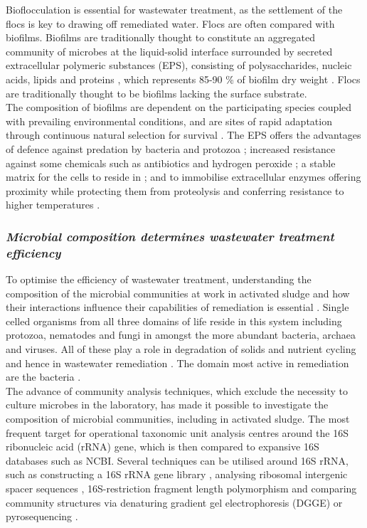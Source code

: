 \documentclass[twoside]{article}
\begin{document}
Bioflocculation is essential for wastewater treatment, as the settlement of the flocs is key to drawing off remediated water. Flocs are often compared with biofilms. Biofilms are traditionally thought to constitute an aggregated community of microbes at the liquid-solid interface surrounded by secreted extracellular polymeric substances (EPS), consisting of polysaccharides, nucleic acids, lipids and proteins \cite{wingender1999}, which represents 85-90 \% of biofilm dry weight \cite{Frolund_96}. Flocs are traditionally thought to be biofilms lacking the surface substrate.\\


The composition of biofilms are dependent on the participating species coupled with prevailing environmental conditions, and are sites of rapid adaptation through continuous natural selection for survival \cite{boles2008,matz2005,palmer2001}.  
The EPS offers the advantages of defence against predation by bacteria \cite{rao2005} and protozoa \cite{matz2005}; increased resistance against some chemicals such as antibiotics and hydrogen peroxide \cite{burmolle_06}; a stable matrix for the cells to reside in \cite{Flemming_10}; and to immobilise extracellular enzymes offering proximity while protecting them from proteolysis and conferring resistance to higher temperatures \cite{wingender2002extracellular,Flemming_10,skillman1998}.\\

\subsubsection{\emph{Microbial composition determines wastewater treatment efficiency}}
To optimise the efficiency of wastewater treatment, understanding the composition of the microbial communities at work in activated sludge and how their interactions influence their capabilities of remediation is essential \cite{daims2006}.
Single celled organisms from all three domains of life reside in this system including protozoa, nematodes and fungi in amongst the more abundant bacteria, archaea and viruses. All of these play a role in degradation of solids and nutrient cycling and hence in wastewater remediation \cite{muchie2010bioremediation}. The domain most active in remediation are the bacteria \cite{spellman2008handbook}.\\


The advance of community analysis techniques, which exclude the necessity to culture microbes in the laboratory, has made it possible to investigate the composition of microbial communities, including in activated sludge. The most frequent target for operational taxonomic unit analysis centres around the 16S ribonucleic acid (rRNA) gene, which is then compared to expansive 16S databases such as NCBI. Several techniques can be utilised around 16S rRNA, such as constructing a 16S rRNA gene library \cite{McGarvey_04}, analysing ribosomal intergenic spacer sequences \cite{Yu_01}, 16S-restriction fragment length polymorphism \cite{Gilbride_06} and comparing community structures via denaturing gradient gel electrophoresis (DGGE) \cite{Hesham_11} or pyrosequencing \cite{wang2012pyrosequencing}.\\
\end{document}
